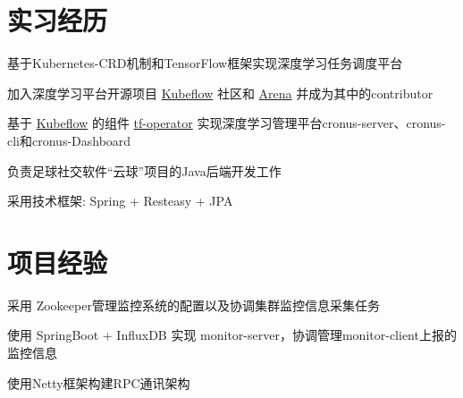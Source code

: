 \documentclass[]{deedy-resume-openfont}
\begin{document}
\begin{minipage}[t]{0.68\textwidth}


\section{实习经历}

\sectionsep
{}
\vspace{\topsep}
\begin{tightemize}
    \item 基于Kubernetes-CRD机制和TensorFlow框架实现深度学习任务调度平台
    \item 加入深度学习平台开源项目 \href{https://github.com/kubeflow/kubeflow}{Kubeflow} 社区和 \href{https://github.com/kubeflow/arena}{Arena} 并成为其中的contributor
    \item 基于 \href{https://github.com/kubeflow/kubeflow}{Kubeflow} 的组件 \href{https://github.com/kubeflow/tf-operator}{tf-operator} 实现深度学习管理平台cronus-server、cronus-cli和cronus-Dashboard
\end{tightemize}
\sectionsep

\sectionsep
{}
\vspace{\topsep}
\begin{tightemize}
    \item 负责足球社交软件“云球”项目的Java后端开发工作
    \item 采用技术框架: Spring + Resteasy + JPA
\end{tightemize}
\sectionsep



\section{项目经验}
\sectionsep


\begin{tightemize}
	\item 采用 Zookeeper管理监控系统的配置以及协调集群监控信息采集任务
	\item 使用 SpringBoot + InfluxDB 实现 monitor-server，协调管理monitor-client上报的监控信息
	\item 使用Netty框架构建RPC通讯架构
	\end{tightemize}
\sectionsep


\end{minipage}
\end{document}
